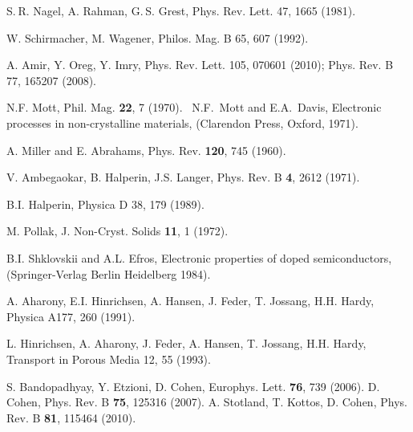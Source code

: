 \documentclass[onecolumn,fleqn,12pt,openany,draft]{book}
\begin{document}
\begin{thebibliography}{99}



S. R. Nagel, A. Rahman, G. S. Grest, 
Phys. Rev. Lett. 47, 1665 (1981).

W. Schirmacher, M. Wagener, 
Philos. Mag. B 65, 607 (1992).


A. Amir, Y. Oreg, Y. Imry,
Phys. Rev. Lett. 105, 070601 (2010); 
%
Phys. Rev. B 77, 165207 (2008).



N.F. Mott, Phil. Mag. {\bf 22}, 7 (1970). 
\ N.F.~Mott and E.A.~Davis, 
Electronic processes in non-crystalline materials, 
(Clarendon Press, Oxford, 1971). 

A. Miller and E. Abrahams, Phys. Rev. {\bf 120}, 745 (1960).

V. Ambegaokar, B. Halperin, J.S. Langer, 
Phys. Rev. B {\bf 4}, 2612 (1971). 

B.I. Halperin, Physica D 38,  179 (1989).

M. Pollak, J. Non-Cryst. Solids {\bf 11}, 1 (1972).

B.I. Shklovskii and A.L. Efros, 
Electronic properties of doped semiconductors,
(Springer-Verlag Berlin Heidelberg 1984).




A. Aharony, E.I. Hinrichsen, A. Hansen, J. Feder, T. Jossang, H.H. Hardy,  
Physica A177, 260 (1991). 

L. Hinrichsen, A. Aharony, J. Feder, A. Hansen, T. Jossang, H.H. Hardy, 
Transport in Porous Media 12, 55 (1993). 



%
S. Bandopadhyay, Y. Etzioni, D. Cohen,
Europhys. Lett. {\bf 76}, 739 (2006).
%
D. Cohen,
Phys. Rev. B {\bf 75}, 125316 (2007).
%
A. Stotland, T. Kottos, D. Cohen, 
Phys. Rev. B {\bf 81}, 115464 (2010). 



\end{thebibliography}
\end{document}
